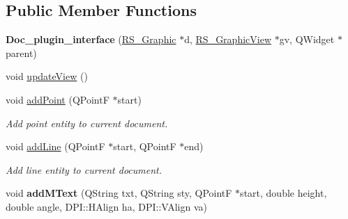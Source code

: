 \subsection*{Public Member Functions}
\begin{DoxyCompactItemize}
\item 
\hypertarget{classDoc__plugin__interface_a94a19d24c32c830bb8833c294f27eb01}{{\bfseries Doc\-\_\-plugin\-\_\-interface} (\hyperlink{classRS__Graphic}{R\-S\-\_\-\-Graphic} $\ast$d, \hyperlink{classRS__GraphicView}{R\-S\-\_\-\-Graphic\-View} $\ast$gv, Q\-Widget $\ast$parent)}\label{classDoc__plugin__interface_a94a19d24c32c830bb8833c294f27eb01}

\item 
void \hyperlink{classDoc__plugin__interface_ad8d0b33eb79c12bc3ff1bf9731052b4c}{update\-View} ()
\item 
void \hyperlink{classDoc__plugin__interface_ac852974e3aeab9b965c78b017ea429b1}{add\-Point} (Q\-Point\-F $\ast$start)
\begin{DoxyCompactList}\small\item\em Add point entity to current document. \end{DoxyCompactList}\item 
void \hyperlink{classDoc__plugin__interface_af4b152bcceadeaab6742888a15d5e0d3}{add\-Line} (Q\-Point\-F $\ast$start, Q\-Point\-F $\ast$end)
\begin{DoxyCompactList}\small\item\em Add line entity to current document. \end{DoxyCompactList}\item 
\hypertarget{classDoc__plugin__interface_a14559d3bcc52028e9fba7636aa743850}{void {\bfseries add\-M\-Text} (Q\-String txt, Q\-String sty, Q\-Point\-F $\ast$start, double height, double angle, D\-P\-I\-::\-H\-Align ha, D\-P\-I\-::\-V\-Align va)}\label{classDoc__plugin__interface_a14559d3bcc52028e9fba7636aa743850}


\end{DoxyCompactItemize}
